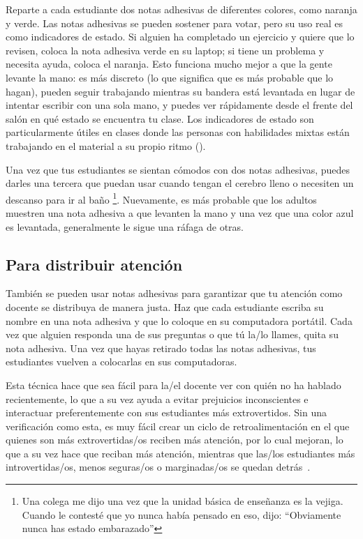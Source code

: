 Reparte a cada estudiante dos notas adhesivas de diferentes colores,
como naranja y verde.
Las notas adhesivas se pueden sostener para votar,
pero su uso real es como indicadores de estado.
Si alguien ha completado un ejercicio y quiere que lo revisen,
coloca la nota adhesiva verde en su laptop;
si tiene un problema y necesita ayuda,
coloca el naranja.
Esto funciona mucho mejor a que la gente levante la mano:
es más discreto (lo que significa que es más probable que lo hagan),
pueden seguir trabajando mientras su bandera está levantada en lugar de intentar escribir con una sola mano,
y puedes ver rápidamente desde el frente del salón en qué estado se encuentra tu clase.
Los indicadores de estado son particularmente útiles en clases donde las personas con habilidades mixtas
están trabajando en el material a su propio ritmo ().

Una vez que tus estudiantes se sientan cómodos con dos notas adhesivas,
puedes darles una tercera que puedan usar cuando tengan el cerebro lleno
o necesiten un descanso para ir al baño \footnote{Una colega me dijo una vez que
la unidad básica de enseñanza es la vejiga.
Cuando le contesté que yo nunca había pensado en eso,
dijo: ``Obviamente nunca has estado embarazado''}.
Nuevamente,
es más probable que los adultos muestren una nota adhesiva a que levanten la mano
y una vez que una color azul es levantada,
generalmente le sigue una ráfaga de otras.

\subsection*{Para distribuir atención}

También se pueden usar notas adhesivas para garantizar que tu atención como docente se distribuya de manera justa.
Haz que cada estudiante escriba su nombre en una nota adhesiva
y que lo coloque en su computadora portátil.
Cada vez que alguien responda una de sus preguntas o que tú la/lo llames,
quita su nota adhesiva.
Una vez que hayas retirado todas las notas adhesivas,
tus estudiantes vuelven a colocarlas en sus computadoras.

Esta técnica hace que sea fácil para la/el docente ver con quién no ha hablado recientemente,
lo que a su vez ayuda a evitar prejuicios inconscientes
e interactuar preferentemente con sus estudiantes más extrovertidos.
Sin una verificación como esta,
es muy fácil crear un ciclo de retroalimentación en el que quienes son más extrovertidas/os reciben más atención,
por lo cual mejoran,
lo que a su vez hace que reciban más atención,
mientras que las/los estudiantes más introvertidas/os, menos seguras/os o marginadas/os se quedan detrás~\cite{Alvi1999,Juss2005}.

